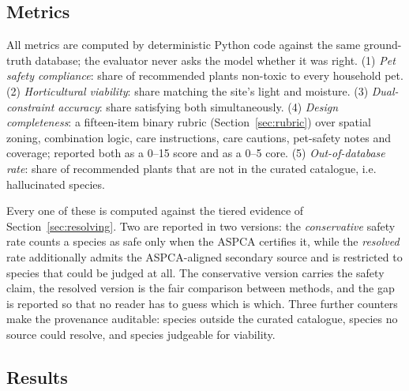 \documentclass[12pt,a4paper]{article}
\begin{document}
\subsection{Metrics}

All metrics are computed by deterministic Python code against the same
ground-truth database; the evaluator never asks the model whether it was
right. (1) \emph{Pet safety compliance}: share of recommended plants
non-toxic to every household pet. (2) \emph{Horticultural viability}: share
matching the site's light and moisture. (3) \emph{Dual-constraint accuracy}:
share satisfying both simultaneously. (4) \emph{Design completeness}: a
fifteen-item binary rubric (Section~\ref{sec:rubric}) over spatial zoning,
combination logic, care instructions, care cautions, pet-safety notes and
coverage; reported both as a 0--15 score and as a 0--5 core. (5)
\emph{Out-of-database rate}: share of recommended plants that are not in the
curated catalogue, i.e. hallucinated species.

Every one of these is computed against the tiered evidence of
Section~\ref{sec:resolving}. Two are reported in two versions: the
\emph{conservative} safety rate counts a species as safe only when the ASPCA
certifies it, while the \emph{resolved} rate additionally admits the
ASPCA-aligned secondary source and is restricted to species that could be
judged at all. The conservative version carries the safety claim, the
resolved version is the fair comparison between methods, and the gap is
reported so that no reader has to guess which is which. Three further
counters make the provenance auditable: species outside the curated
catalogue, species no source could resolve, and species judgeable for
viability.

\subsection{Results}
\end{document}
